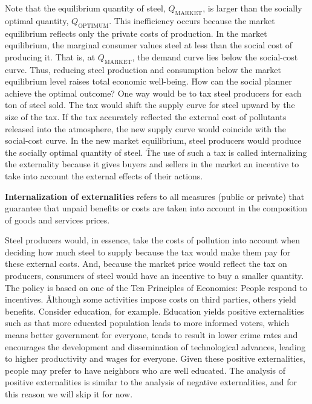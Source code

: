 Note that the equilibrium quantity of steel, $Q_\text{MARKET}$, is larger than the socially optimal quantity,
$Q_\text{OPTIMUM}$. This inefficiency occurs because the market equilibrium reflects only the private costs of
production. In the market equilibrium, the marginal consumer values steel at less than the social cost of producing
it. That is, at $Q_\text{MARKET}$, the demand curve lies below the social-cost curve. Thus, reducing steel
production and consumption below the market equilibrium level raises total economic well-being. \v

How can the social planner achieve the optimal outcome? One way would be to tax steel producers for each ton of steel
sold. The tax would shift the supply curve for steel upward by the size of the tax. If the tax accurately reflected
the external cost of pollutants released into the atmosphere, the new supply curve would coincide with the
social-cost curve. In the new market equilibrium, steel producers would produce the socially optimal quantity of
steel. \v

The use of such a tax is called internalizing the externality because it gives buyers and sellers in the market an
incentive to take into account the external effects of their actions.

\textbf{Internalization of externalities} refers to all measures (public or private) that guarantee that unpaid benefits
or costs are taken into account in the composition of goods and services prices.
\ed

Steel producers would, in essence, take the costs of pollution into account when deciding how much steel to supply
because the tax would make them pay for these external costs. And, because the market price would reflect the tax on
producers, consumers of steel would have an incentive to buy a smaller quantity. The policy is based on one of the
Ten Principles of Economics: People respond to incentives. \v

Although some activities impose costs on third parties, others yield benefits. Consider education, for example.
Education yields positive externalities such as that more educated population leads to more informed voters, which
means better government for everyone, tends to result in lower crime rates and encourages the development and
dissemination of technological advances, leading to higher productivity and wages for everyone. Given these positive
externalities, people may prefer to have neighbors who are well educated. The analysis of positive externalities is
similar to the analysis of negative externalities, and for this reason we will skip it for now.

